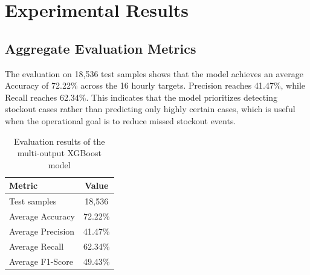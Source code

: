\documentclass{llncs}
\begin{document}
\begin{table}[htbp]
\centering
\caption{Optimized prediction thresholds by operating hour}
\label{tab:thresholds}

\vspace{0.4em}
\end{table}

\section{Experimental Results}

\subsection{Aggregate Evaluation Metrics}
The evaluation on 18,536 test samples shows that the model achieves an average Accuracy of 72.22\% across the 16 hourly targets. Precision reaches 41.47\%, while Recall reaches 62.34\%. This indicates that the model prioritizes detecting stockout cases rather than predicting only highly certain cases, which is useful when the operational goal is to reduce missed stockout events.

\begin{table}[htbp]
\centering
\caption{Evaluation results of the multi-output XGBoost model}
\label{tab:model-results}
\begin{tabular}{lc}
\toprule
\textbf{Metric} & \textbf{Value} \\
\midrule
Test samples & 18,536 \\
Average Accuracy & 72.22\% \\
Average Precision & 41.47\% \\
Average Recall & 62.34\% \\
Average F1-Score & 49.43\% \\
\bottomrule
\end{tabular}
\end{table}
\end{document}
